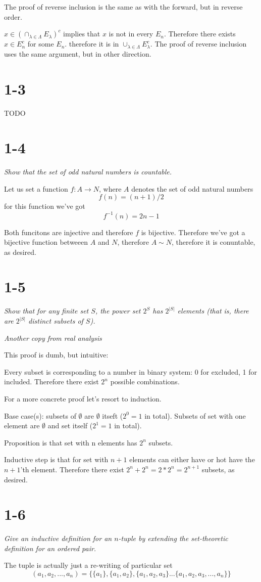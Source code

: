 \documentclass[11pt,oneside,titlepage]{book}
\begin{document}
The proof of reverse inclusion is the same as with the forward, but in reverse
order.

$x \in \left(\cap_{\lambda \in \Lambda} E_\lambda \right)^c$ implies that
$x$ is not in every $E_n$. Therefore there exists $x \in E_n^c$ for some $E_n$.
therefore it is in $\cup_{\lambda \in \Lambda} E_\lambda^c$. The proof of
reverse inclusion uses the same argument, but in other direction.

\section*{1-3}
TODO

\section*{1-4}
\textit{Show that the set of odd natural numbers is countable.}

Let us set a function $f: A \to N$, where $A$ denotes the set of
odd natural numbers
$$f(n) = (n + 1) / 2$$
for this function  we've got
$$f^{-1}(n) = 2n - 1$$

Both funcitons are injective and therefore $f$ is bijective. Therefore
we've got a bijective function betweeen $A$ and $N$, therefore
$A \sim N$, therefore it is conuntable, as desired.

\section*{1-5}
\textit{Show that for any finite set $S$, the power set $2^S$ has
  $2^{|S|}$ elements (that is, there are $2^{|S|}$ distinct subsets of $S$).}

\textit{Another copy from real analysis}

This proof is dumb, but intuitive:

Every subset is corresponding to a number in binary system: 0 for excluded,
1 for included. Therefore there exist $2^n$ possible combinations.

For a more concrete proof let's resort to induction.

Base case(s): subsets of $\emptyset$ are $\emptyset$ itseft
($2^0 = 1$ in total). Subsets of
set with one element are $\emptyset$ and set itself ($2^1 = 1$ in total).

Proposition is that set with n elements has $2^n$ subsets.

Inductive step is that for set with $n + 1$ elements can either have or hot
have the $n + 1$'th element. Therefore there exist $2^n + 2^n = 2 * 2^n =
2^{n + 1}$ subsets, as desired.

\section*{1-6}
\textit{Give an inductive definition for an $n$-tuple by extending the
  set-theoretic definition for an ordered pair.}

The tuple is actually just a re-writing of particular set
$$(a_1, a_2, ..., a_n) = \{\{a_1\}, \{a_1, a_2\}, \{a_1, a_2, a_3\} ...
\{a_1, a_2, a_3, ..., a_n\}\}$$
\end{document}
